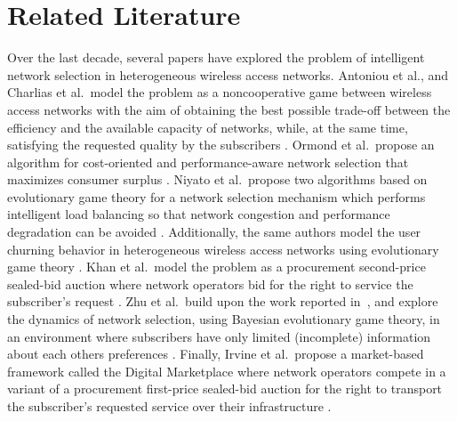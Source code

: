 \section{Related Literature} %
\label{sec:related_literature}
Over the last decade, several papers have explored the problem of intelligent network selection in heterogeneous wireless access networks. Antoniou et al., and Charlias et al.~model the problem as a noncooperative game between wireless access networks with the aim of obtaining the best possible trade-off between the efficiency and the available capacity of networks, while, at the same time, satisfying the requested quality by the subscribers \cite{Antoniou07, Charilas08}. Ormond et al.~propose an algorithm for cost-oriented and performance-aware network selection that maximizes consumer surplus \cite{OrmondCS106, OrmondCS206}. Niyato et al.~propose two algorithms based on evolutionary game theory for a network selection mechanism which performs intelligent load balancing so that network congestion and performance degradation can be avoided \cite{Niyato09}. Additionally, the same authors model the user churning behavior in heterogeneous wireless access networks using evolutionary game theory \cite{NiyatoHossainConf2008}. Khan et al.~model the problem as a procurement second-price sealed-bid auction where network operators bid for the right to service the subscriber's request \cite{Khan110, Khan210}. Zhu et al.~build upon the work reported in~\cite{Niyato09}, and explore the dynamics of network selection, using Bayesian evolutionary game theory, in an environment where subscribers have only limited (incomplete) information about each others preferences \cite{ZhuNiyato2010}. Finally, Irvine et al.~propose a market-based framework called the Digital Marketplace where network operators compete in a variant of a procurement first-price sealed-bid auction for the right to transport the subscriber's requested service over their infrastructure \cite{DMLeBodic00, DMIrvine01, DMIrvine02}.


